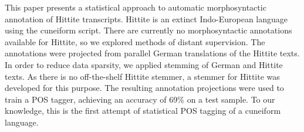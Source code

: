This paper presents a statistical approach to automatic morphosyntactic annotation of Hittite transcripts. Hittite is an extinct Indo-European language using the cuneiform script. There are currently no morphosyntactic annotations available for Hittite, so we explored methods of distant supervision. The annotations were projected from parallel German translations of the Hittite texts. In order to reduce data sparsity, we applied stemming of German and Hittite texts. As there is no off-the-shelf Hittite stemmer, a stemmer for Hittite was developed for this purpose. The resulting annotation projections were used to train a POS tagger, achieving an accuracy of 69\% on a test sample. To our knowledge, this is the first attempt of statistical POS tagging of a cuneiform language.
